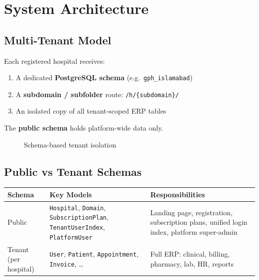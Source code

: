 \documentclass[11pt,a4paper]{report}
\begin{document}
\chapter{System Architecture}

\section{Multi-Tenant Model}

Each registered hospital receives:
\begin{enumerate}[noitemsep]
    \item A dedicated \textbf{PostgreSQL schema} (e.g.\ \texttt{gph\_islamabad})
    \item A \textbf{subdomain / subfolder} route: \texttt{/h/\{subdomain\}/}
    \item An isolated copy of all tenant-scoped ERP tables
\end{enumerate}

The \textbf{public schema} holds platform-wide data only.

\begin{figure}[h]
\centering
{}
\caption{Schema-based tenant isolation}
\end{figure}

\section{Public vs Tenant Schemas}

\begin{longtable}{@{}p{4cm}p{5cm}p{5.5cm}@{}}
\toprule
\textbf{Schema} & \textbf{Key Models} & \textbf{Responsibilities} \\
\midrule
\endhead
Public &
\texttt{Hospital}, \texttt{Domain}, \texttt{SubscriptionPlan}, \texttt{TenantUserIndex}, \texttt{PlatformUser} &
Landing page, registration, subscription plans, unified login index, platform super-admin \\
\addlinespace
Tenant (per hospital) &
\texttt{User}, \texttt{Patient}, \texttt{Appointment}, \texttt{Invoice}, \ldots &
Full ERP: clinical, billing, pharmacy, lab, HR, reports \\
\bottomrule
\end{longtable}
\end{document}
